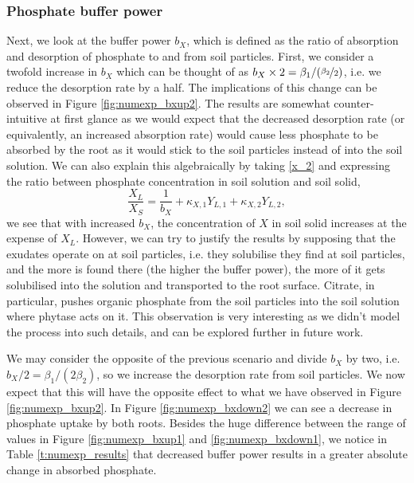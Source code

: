 \documentclass[11pt]{article}
\numberwithin{equation}{section}
\begin{document}
\subsubsection{Phosphate buffer power}
\label{sec:numexp_bx}
Next, we look at the buffer power $b_X$, which is defined as the ratio of absorption and desorption of phosphate to and from soil particles. First, we consider a twofold increase in $b_X$ which can be thought of as $b_X \times 2 = \beta_1 / (  \nicefrac{\beta_2}{2} )$, i.e. we reduce the desorption rate by a half. The implications of this change can be observed in Figure \ref{fig:numexp_bxup2}. The results are somewhat counter-intuitive at first glance as we would expect that the decreased desorption rate (or equivalently, an increased absorption rate) would cause less phosphate to be absorbed by the root as it would stick to the soil particles instead of into the soil solution. We can also explain this algebraically by taking \eqref{x_2} and expressing the ratio between phosphate concentration in soil solution and soil solid,
\begin{equation}
    \frac{X_L}{X_S} = \frac{1}{b_X} + \kappa_{X,1} Y_{L,1} + \kappa_{X,2} Y_{L,2},
\end{equation}
we see that with increased $b_X$, the concentration of $X$ in soil solid increases at the expense of $X_L$. However, we can try to justify the results by supposing that the exudates operate on  at soil particles, i.e. they solubilise  they find at soil particles, and the more  is found there (the higher the buffer power), the more of it gets solubilised into the solution and transported to the root surface. Citrate, in particular, pushes organic phosphate from the soil particles into the soil solution where phytase acts on it. This observation is very interesting as we didn't model the process into such details, and can be explored further in future work.

We may consider the opposite of the previous scenario and divide $b_X$ by two, i.e. $b_X / 2 = \beta_1 / (2 \beta_2)$, so we increase the desorption rate from soil particles. We now expect that this will have the opposite effect to what we have observed in Figure \ref{fig:numexp_bxup2}. In Figure \ref{fig:numexp_bxdown2} we can see a decrease in phosphate uptake by both roots. Besides the huge difference between the range of values in Figure \ref{fig:numexp_bxup1} and \ref{fig:numexp_bxdown1}, we notice in Table \ref{t:numexp_results} that decreased buffer power results in a greater absolute change in absorbed phosphate.
\end{document}
